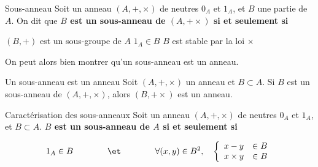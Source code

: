 \documentclass[a4paper,french,bookmarks]{article}
\begin{document}
\begin{definition}{Sous-anneau}{}
    Soit un anneau $(A, +, \times)$ de neutres $0_A$ et $1_A$, et $B$ une partie de $A$. On dit que \bf{$B$ est un sous-anneau de $(A, + \times)$} si et seulement si
    \begin{enumerate}
        \ithand $(B, +)$ est un sous-groupe de $A$
        \ithand $1_A \in B$
        \ithand $B$ est stable par la loi $\times$
    \end{enumerate}
\end{definition}

On peut alors bien montrer qu'un sous-anneau est un anneau.

\begin{property}{Un sous-anneau est un anneau}{}
    Soit $(A, +, \times)$ un anneau et $B \subset A$. Si $B$ est un sous-anneau de $(A, +, \times)$, alors $(B, + \times)$ est un anneau.
\end{property}


\begin{theorem}{Caractérisation des sous-anneaux}{}
     Soit un anneau $(A, +, \times)$ de neutres $0_A$ et $1_A$, et $B \subset A$. \bf{$B$ est un sous-anneau de $A$} si et seulement si
     
     \[ 1_A \in B \qquad\qquad\et\qquad\qquad \forall (x, y) \in B^2,\quad \left\lbrace\begin{array}{cc}
         x - y &\in B  \\
         x \times y  &\in B 
     \end{array}\right.\]
     
\end{theorem}

\end{document}

